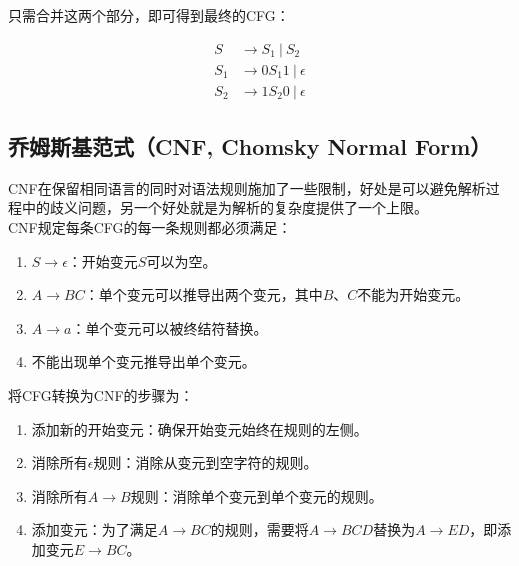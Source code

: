 只需合并这两个部分，即可得到最终的CFG：

\vspace{-1cm}

\begin{align*}
    S   & \rightarrow S_1\ |\ S_2          \\
    S_1 & \rightarrow 0S_{1}1\ |\ \epsilon \\
    S_2 & \rightarrow 1S_{2}0\ |\ \epsilon
\end{align*}

\vspace{0.5cm}

\subsection{乔姆斯基范式（CNF, Chomsky Normal Form）}

CNF在保留相同语言的同时对语法规则施加了一些限制，好处是可以避免解析过程中的歧义问题，另一个好处就是为解析的复杂度提供了一个上限。\\

CNF规定每条CFG的每一条规则都必须满足：

\begin{enumerate}
    \item $ S \rightarrow \epsilon $：开始变元$ S $可以为空。
    \item $ A \rightarrow BC $：单个变元可以推导出两个变元，其中$ B $、$ C $不能为开始变元。
    \item $ A \rightarrow a $：单个变元可以被终结符替换。
    \item 不能出现单个变元推导出单个变元。
\end{enumerate}

\vspace{0.5cm}

将CFG转换为CNF的步骤为：

\begin{enumerate}
    \item 添加新的开始变元：确保开始变元始终在规则的左侧。
    \item 消除所有$ \epsilon $规则：消除从变元到空字符的规则。
    \item 消除所有$ A \rightarrow B $规则：消除单个变元到单个变元的规则。
    \item 添加变元：为了满足$ A \rightarrow BC $的规则，需要将$ A \rightarrow BCD $替换为$ A \rightarrow ED $，即添加变元$ E \rightarrow BC $。
\end{enumerate}

\vspace{0.5cm}

